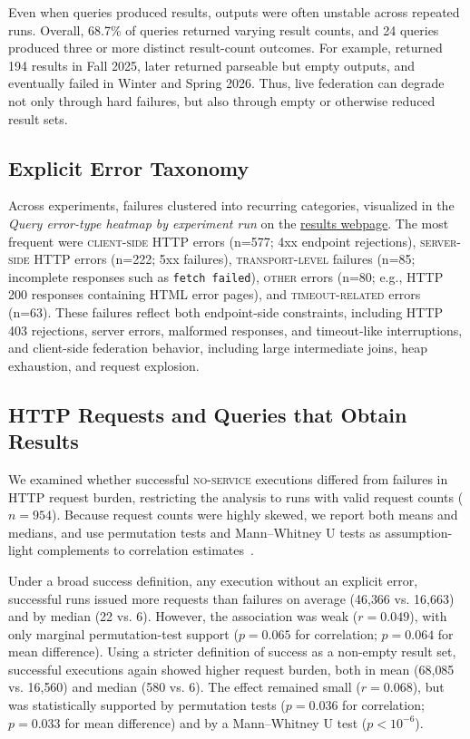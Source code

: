\documentclass[runningheads]{llncs}
\begin{document}
Even when queries produced results, outputs were often unstable across repeated runs. 
Overall, 68.7\% of queries returned varying result counts, and 24 queries produced three or more distinct result-count outcomes. 
For example, \texttt{} returned 194 results in Fall 2025, later returned parseable but empty outputs, and eventually failed in Winter and Spring 2026. 
Thus, live federation can degrade not only through hard failures, but also through empty or otherwise reduced result sets.

\subsection{Explicit Error Taxonomy}\label{sec5.2}
Across experiments, failures clustered into recurring categories, visualized in the \textit{Query error-type heatmap by experiment run} on the \href{https://ecrum19.github.io/fed-survey-results/?mode=query&query=001&queryVariant=original}{results webpage}. 
The most frequent were \textsc{client-side HTTP} errors (n=577; 4xx endpoint rejections), \textsc{server-side HTTP} errors (n=222; 5xx failures), \textsc{transport-level} failures (n=85; incomplete responses such as \texttt{fetch failed}), \textsc{other} errors (n=80; e.g., HTTP 200 responses containing HTML error pages), and \textsc{timeout-related} errors (n=63). 
These failures reflect both endpoint-side constraints, including HTTP 403 rejections, server errors, malformed responses, and timeout-like interruptions, and client-side federation behavior, including large intermediate joins, heap exhaustion, and request explosion. 

\subsection{HTTP Requests and Queries that Obtain Results}\label{sec5.3}
We examined whether successful \textsc{no-service} executions differed from failures in HTTP request burden, restricting the analysis to runs with valid request counts ($n=954$). 
Because request counts were highly skewed, we report both means and medians, and use permutation tests and Mann--Whitney U tests as assumption-light complements to correlation estimates~\cite{altman1994quartiles,good2005permutation,mann1947test}.

Under a broad success definition, any execution without an explicit error, successful runs issued more requests than failures on average (46{,}366 vs. 16{,}663) and by median (22 vs. 6). 
However, the association was weak ($r=0.049$), with only marginal permutation-test support ($p=0.065$ for correlation; $p=0.064$ for mean difference).
Using a stricter definition of success as a non-empty result set, successful executions again showed higher request burden, both in mean (68{,}085 vs. 16{,}560) and median (580 vs. 6). 
The effect remained small ($r=0.068$), but was statistically supported by permutation tests ($p=0.036$ for correlation; $p=0.033$ for mean difference) and by a Mann--Whitney U test ($p<10^{-6}$).
\end{document}
